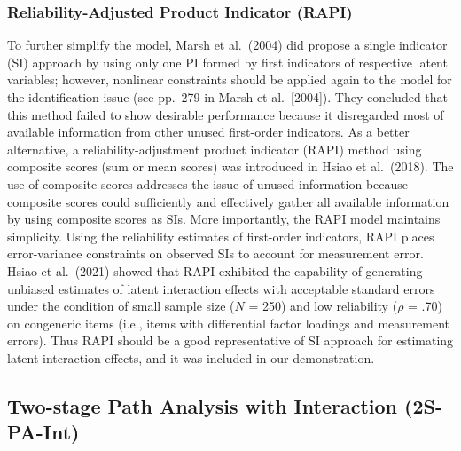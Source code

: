 \documentclass[
  man]{apa7}
\begin{document}
\hypertarget{reliability-adjusted-product-indicator-rapi}{%
\subsubsection{Reliability-Adjusted Product Indicator (RAPI)}\label{reliability-adjusted-product-indicator-rapi}}

To further simplify the model, Marsh et al.~(2004) did propose a single indicator (SI) approach by using only one PI formed by first indicators of respective latent variables; however, nonlinear constraints should be applied again to the model for the identification issue (see pp.~279 in Marsh et al.~{[}2004{]}). They concluded that this method failed to show desirable performance because it disregarded most of available information from other unused first-order indicators. As a better alternative, a reliability-adjustment product indicator (RAPI) method using composite scores (sum or mean scores) was introduced in Hsiao et al.~(2018). The use of composite scores addresses the issue of unused information because composite scores could sufficiently and effectively gather all available information by using composite scores as SIs. More importantly, the RAPI model maintains simplicity. Using the reliability estimates of first-order indicators, RAPI places error-variance constraints on observed SIs to account for measurement error. Hsiao et al.~(2021) showed that RAPI exhibited the capability of generating unbiased estimates of latent interaction effects with acceptable standard errors under the condition of small sample size (\(\textit{N}\) = 250) and low reliability (\(\mathit{\rho}\) = .70) on congeneric items (i.e., items with differential factor loadings and measurement errors). Thus RAPI should be a good representative of SI approach for estimating latent interaction effects, and it was included in our demonstration.

\hypertarget{two-stage-path-analysis-with-interaction-2s-pa-int}{%
\subsection{Two-stage Path Analysis with Interaction (2S-PA-Int)}\label{two-stage-path-analysis-with-interaction-2s-pa-int}}
\end{document}
